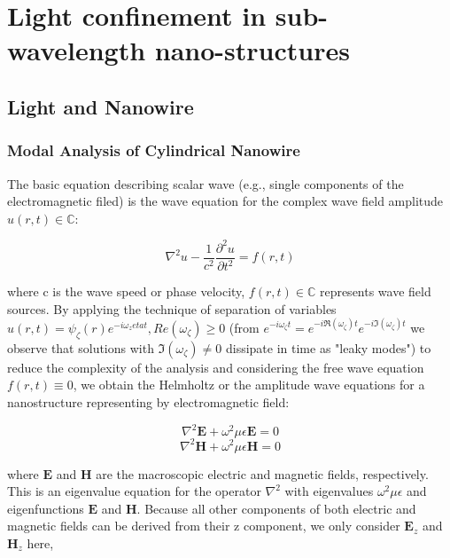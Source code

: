 \chapter[Light Confinement]{Light confinement in sub-wavelength nano-structures} \label{LM}


\section{Light and Nanowire} \label{LightNW}

\subsection{Modal Analysis of Cylindrical Nanowire}

The basic equation describing scalar wave (e.g., single components of the
electromagnetic filed) is the wave equation for the complex wave field
amplitude $u(r,t)\in\mathbb{C}$:

\begin{equation}
  {\nabla}^2u-\frac{1}{c^2}\frac{{\partial}^2u}{\partial{t}^2}=f(r,t)
\end{equation}

where c is the wave speed or phase velocity, $f(r,t)\in\mathbb{C}$ represents
wave field sources. By applying the technique of separation of variables
$u(r,t)=\psi_\zeta(r)e^{-i\omega_zeta{t}}, Re(\omega_\zeta)\geq0$ (from
$e^{-i\omega_\zeta{t}}=e^{-i\Re(\omega_\zeta)t}e^{-i\Im(\omega_\zeta)t}$ we
observe that solutions with $\Im(\omega_\zeta)\neq0$ dissipate in time as
"leaky modes") to reduce the complexity of the analysis and considering the
free wave equation $f(r,t)\equiv{0}$, we obtain the Helmholtz or the amplitude
wave equations for a nanostructure representing by electromagnetic field:

\begin{equation}
  {\nabla}^2\bm{E} + {\omega}^2\mu\epsilon\bm{E} = 0
\end{equation}
\begin{equation}
  {\nabla}^2\bm{H} + {\omega}^2\mu\epsilon\bm{H} = 0
\end{equation}

where $\bm{E}$ and $\bm{H}$ are the macroscopic electric and magnetic fields,
respectively. This is an eigenvalue equation for the operator $\nabla^2$ with
eigenvalues ${\omega}^2\mu\epsilon$ and eigenfunctions $\bm{E}$ and $\bm{H}$.
Because all other components of both electric and magnetic fields can be
derived from their z component, we only consider $\bm{E}_z$ and $\bm{H}_z$
here,

